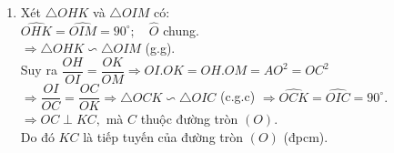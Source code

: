 \begin{bt}
{\begin{enumerate}
			Do đó $ A $ thuộc đường tròn đường kính $ OM. \hfill(2)$\\
			Từ $ (1) $ và $ (2) $ ta có bốn điểm $ A, I, O, M $ thuộc đường tròn đường kính $ OM. $ 
			\item  Xét $\triangle OHK $ và $ \triangle OIM $ có:\\
			$ \widehat{OHK}=\widehat{OIM}=90^{\circ};\quad \widehat{O}$ chung.\\
			$ \Rightarrow  \triangle OHK \backsim \triangle OIM $ (g.g).\\
			Suy ra $ \dfrac{OH}{OI}=\dfrac{OK}{OM} \Rightarrow OI.OK = OH.OM = AO^2=OC^2 $\\
			$ \Rightarrow \dfrac{OI}{OC}=\dfrac{OC}{OK} \Rightarrow \triangle OCK \backsim \triangle OIC $ (c.g.c) $ \Rightarrow \widehat{OCK}=\widehat{OIC}=90^{\circ}. $\\
			$ \Rightarrow OC \perp KC, $ mà $ C $ thuộc đường tròn $ (O). $\\
			Do đó $ KC $ là tiếp tuyến của đường tròn $ (O) $ (đpcm).
		\end{enumerate}
		
	}
\end{bt}







